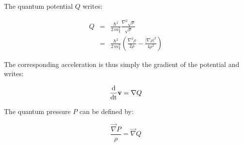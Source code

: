 The quantum potential $Q$ writes:

\begin{eqnarray}
  Q & = & \frac{\hbar^2}{2\,m^2_{\chi}} \frac{\nabla^2 \sqrt{\rho}}{\sqrt{\rho}}\\
    & = & \frac{\hbar^2}{2\,m^2_{\chi}} \left(  \frac{\nabla^2\rho}{2\rho} -  \frac{|\nabla\rho|^2}{4\rho^2} \right)
\end{eqnarray}

The corresponding acceleration is thus simply the gradient of the potential and writes:

\begin{equation}
  \frac{\rm{d}}{\rm{d}t} \vec{v} = \vec{\nabla} Q                       
\end{equation}


The quantum pressure $P$ can be defined by:

\begin{equation}
  \frac{\vec{\nabla} P}{\rho} =  \vec{\nabla} Q                     
\end{equation}


















